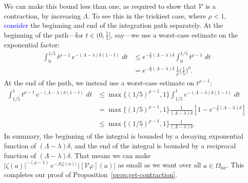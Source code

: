 \documentclass[review]{siamart220329}
\newcommand{\volterra}{\mathcal{V}}
\newcommand{\far}{\Omega_\text{far}}
\begin{document}
We can make this bound less than one, as required to show that $\volterra$ is a contraction, by increasing $\Lambda$. To see this in the trickiest case, where $\rho < 1$, \textcolor{blue}{consider} the beginning and end of the integration path separately. At the beginning of the path---for $t \in \big(0, \tfrac{1}{5}\big]$, say---we use a worst-case estimate on the exponential factor:
\begin{align*}
\int_0^{1/5} t^{\rho-1}\,e^{-(\Lambda - \lambda)\delta(1 - t)}\;dt & \le e^{-\frac{4}{5}(\Lambda -\lambda)\delta} \int_0^{1/5} t^{\rho-1}\;dt \\
& = e^{-\frac{4}{5}(\Lambda - \lambda)\delta}\,\tfrac{1}{\rho} \big(\tfrac{1}{5}\big)^\rho.
\end{align*}
At the end of the path, we instead use a worst-case estimate on $t^{\rho-1}$:
\begin{align*}
\int_{1/5}^1 t^{\rho-1}\,e^{-(\Lambda - \lambda)\delta(1 - t)}\;dt & \le \max\{(1/5)^{\rho-1}, 1\} \int_{1/5}^1 e^{-(\Lambda - \lambda)\delta(1 - t)}\;dt \\
& = \max\{(1/5)^{\rho-1}, 1\} \frac{1}{(\Lambda - \lambda)\delta}\left[ 1 - e^{-\tfrac{4}{5}(\Lambda - \lambda)\delta} \right] \\
& \le \max\{(1/5)^{\rho-1}, 1\} \frac{1}{(\Lambda - \lambda)\delta}.
\end{align*}
In summary, the beginning of the integral is bounded by a decaying exponential function of $(\Lambda - \lambda)\delta$, and the end of the integral is bounded by a reciprocal function of $(\Lambda - \lambda)\delta$. That means we can make $|\zeta(a)|^{-(\rho-1)}\,e^{-\Lambda|\zeta(a)|}\,|[\volterra\varphi](a)|$ as small as we want over all $a \in \far$. This completes our proof of Proposition~\ref{prop:get-contraction}.
\end{document}
